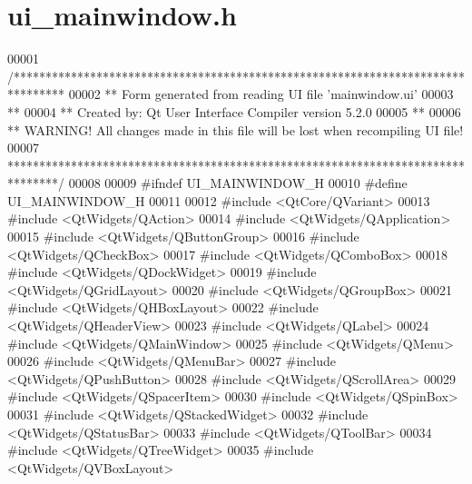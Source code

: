 \hypertarget{a00052_source}{\section{ui\+\_\+mainwindow.\+h}
\label{a00052_source}
}

\begin{DoxyCode}
00001 \textcolor{comment}{/********************************************************************************}
00002 \textcolor{comment}{** Form generated from reading UI file 'mainwindow.ui'}
00003 \textcolor{comment}{**}
00004 \textcolor{comment}{** Created by: Qt User Interface Compiler version 5.2.0}
00005 \textcolor{comment}{**}
00006 \textcolor{comment}{** WARNING! All changes made in this file will be lost when recompiling UI file!}
00007 \textcolor{comment}{********************************************************************************/}
00008 
00009 \textcolor{preprocessor}{#ifndef UI\_MAINWINDOW\_H}
00010 \textcolor{preprocessor}{#define UI\_MAINWINDOW\_H}
00011 
00012 \textcolor{preprocessor}{#include <QtCore/QVariant>}
00013 \textcolor{preprocessor}{#include <QtWidgets/QAction>}
00014 \textcolor{preprocessor}{#include <QtWidgets/QApplication>}
00015 \textcolor{preprocessor}{#include <QtWidgets/QButtonGroup>}
00016 \textcolor{preprocessor}{#include <QtWidgets/QCheckBox>}
00017 \textcolor{preprocessor}{#include <QtWidgets/QComboBox>}
00018 \textcolor{preprocessor}{#include <QtWidgets/QDockWidget>}
00019 \textcolor{preprocessor}{#include <QtWidgets/QGridLayout>}
00020 \textcolor{preprocessor}{#include <QtWidgets/QGroupBox>}
00021 \textcolor{preprocessor}{#include <QtWidgets/QHBoxLayout>}
00022 \textcolor{preprocessor}{#include <QtWidgets/QHeaderView>}
00023 \textcolor{preprocessor}{#include <QtWidgets/QLabel>}
00024 \textcolor{preprocessor}{#include <QtWidgets/QMainWindow>}
00025 \textcolor{preprocessor}{#include <QtWidgets/QMenu>}
00026 \textcolor{preprocessor}{#include <QtWidgets/QMenuBar>}
00027 \textcolor{preprocessor}{#include <QtWidgets/QPushButton>}
00028 \textcolor{preprocessor}{#include <QtWidgets/QScrollArea>}
00029 \textcolor{preprocessor}{#include <QtWidgets/QSpacerItem>}
00030 \textcolor{preprocessor}{#include <QtWidgets/QSpinBox>}
00031 \textcolor{preprocessor}{#include <QtWidgets/QStackedWidget>}
00032 \textcolor{preprocessor}{#include <QtWidgets/QStatusBar>}
00033 \textcolor{preprocessor}{#include <QtWidgets/QToolBar>}
00034 \textcolor{preprocessor}{#include <QtWidgets/QTreeWidget>}
00035 \textcolor{preprocessor}{#include <QtWidgets/QVBoxLayout>}

\end{DoxyCode}
